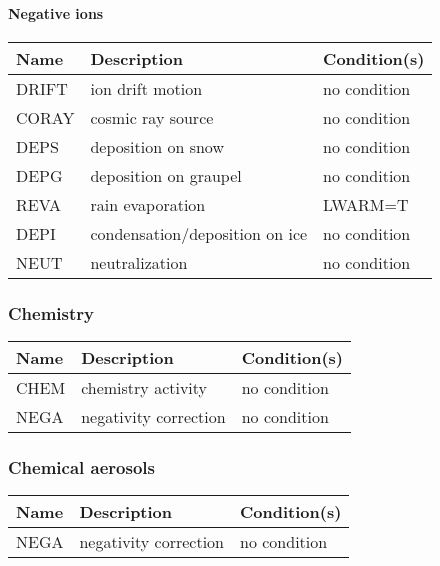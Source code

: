 \paragraph{Negative ions}
\mbox{} %

\begin{longtable} {|p{}|p{}|p{}|}
\hline
Name & Description & Condition(s) \\
\hline \hline
\endhead
DRIFT  & ion drift motion               & no condition \\\hline
CORAY  & cosmic ray source              & no condition \\\hline
DEPS   & deposition on snow             & no condition \\\hline
DEPG   & deposition on graupel          & no condition \\\hline
REVA   & rain evaporation               & LWARM=T      \\\hline
DEPI   & condensation/deposition on ice & no condition \\\hline
NEUT   & neutralization                 & no condition \\\hline
\end{longtable}


\subsubsection{Chemistry}

\begin{longtable} {|p{}|p{}|p{}|}
\hline
Name & Description & Condition(s) \\
\hline \hline
\endhead
CHEM   & chemistry activity    & no condition \\\hline
NEGA   & negativity correction & no condition \\\hline
\end{longtable}


\subsubsection{Chemical aerosols}

\begin{longtable} {|p{}|p{}|p{}|}
\hline
Name & Description & Condition(s) \\
\hline \hline
\endhead
NEGA   & negativity correction & no condition \\\hline
\end{longtable}


